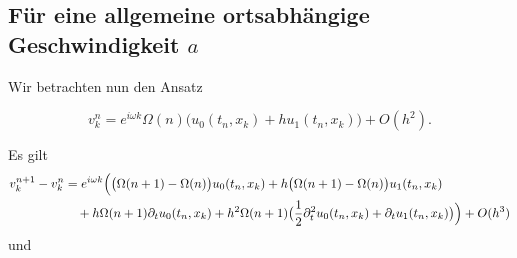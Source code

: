 
\subsection*{Für eine allgemeine ortsabhängige Geschwindigkeit $a$}

Wir betrachten nun den Ansatz

\[ v^n_k = e^{i \omega k} \Omega(n) \bigl( u_0(t_n, x_k) + h u_1(t_n, x_k) \bigr) + O(h^2). \]

Es gilt
\begin{align} \label{wkb:zeitdiff}
\begin{split}
v^{n+1}_k - v^n_k
&= e^{i \omega k} \Bigl( \bigl(\Omega(n+1) - \Omega(n) \bigr) u_0(t_n, x_k) + h \bigl(\Omega(n+1) - \Omega(n) \bigr) u_1(t_n, x_k)\\
&\quad + h \Omega(n+1) \partial_t u_0(t_n, x_k) + h^2 \Omega(n+1) \bigl( \frac{1}{2} \partial^2_t u_0(t_n, x_k) + \partial_t u_1(t_n, x_k) \bigr) \Bigr) + O(h^3)
\end{split}
\end{align}
und
